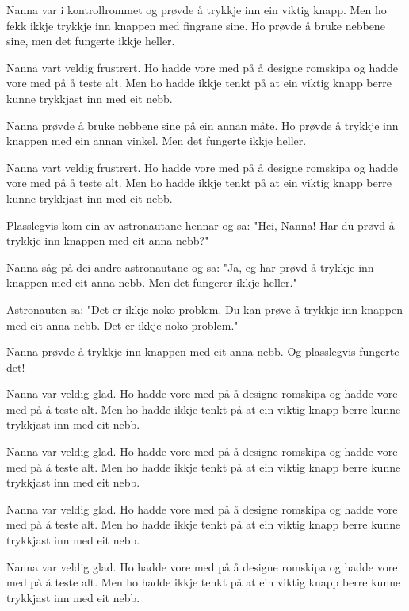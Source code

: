 \documentclass[10pt]{article}
\begin{document}
{\begin{minipage}{\textwidth}
\par\smallskip
Nanna var i kontrollrommet og prøvde å trykkje inn ein viktig knapp. Men ho fekk ikkje trykkje inn knappen med fingrane sine. Ho prøvde å bruke nebbene sine, men det fungerte ikkje heller.
\par\smallskip
Nanna vart veldig frustrert. Ho hadde vore med på å designe romskipa og hadde vore med på å teste alt. Men ho hadde ikkje tenkt på at ein viktig knapp berre kunne trykkjast inn med eit nebb.
\par\smallskip
Nanna prøvde å bruke nebbene sine på ein annan måte. Ho prøvde å trykkje inn knappen med ein annan vinkel. Men det fungerte ikkje heller.
\par\smallskip
Nanna vart veldig frustrert. Ho hadde vore med på å designe romskipa og hadde vore med på å teste alt. Men ho hadde ikkje tenkt på at ein viktig knapp berre kunne trykkjast inn med eit nebb.
\par\smallskip
Plasslegvis kom ein av astronautane hennar og sa: "Hei, Nanna! Har du prøvd å trykkje inn knappen med eit anna nebb?"
\par\smallskip
Nanna såg på dei andre astronautane og sa: "Ja, eg har prøvd å trykkje inn knappen med eit anna nebb. Men det fungerer ikkje heller."
\par\smallskip
Astronauten sa: "Det er ikkje noko problem. Du kan prøve å trykkje inn knappen med eit anna nebb. Det er ikkje noko problem."
\par\smallskip
Nanna prøvde å trykkje inn knappen med eit anna nebb. Og plasslegvis fungerte det!
\par\smallskip
Nanna var veldig glad. Ho hadde vore med på å designe romskipa og hadde vore med på å teste alt. Men ho hadde ikkje tenkt på at ein viktig knapp berre kunne trykkjast inn med eit nebb.
\par\smallskip
Nanna var veldig glad. Ho hadde vore med på å designe romskipa og hadde vore med på å teste alt. Men ho hadde ikkje tenkt på at ein viktig knapp berre kunne trykkjast inn med eit nebb.
\par\smallskip
Nanna var veldig glad. Ho hadde vore med på å designe romskipa og hadde vore med på å teste alt. Men ho hadde ikkje tenkt på at ein viktig knapp berre kunne trykkjast inn med eit nebb.
\par\smallskip
Nanna var veldig glad. Ho hadde vore med på å designe romskipa og hadde vore med på å teste alt. Men ho hadde ikkje tenkt på at ein viktig knapp berre kunne trykkjast inn med eit nebb.
\par\smallskip

\end{minipage}}
\end{document}
